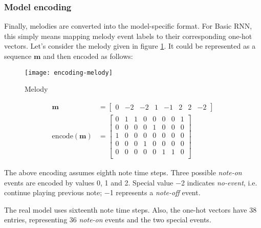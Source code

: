 \documentclass[../../report.tex]{subfiles}
\begin{document}
\subsubsection{Model encoding}

Finally, melodies are converted into the model-specific format. For Basic RNN,
this simply means mapping melody event labels to their corresponding one-hot
vectors. Let's consider the melody given in figure \ref{fig:encoding-melody}. It
could be represented as a sequence \(\bm{m}\) and then encoded as follows:

\begin{figure}[h]
  \centering
  \texttt{[image: encoding-melody]}
  \caption{Melody}
  \label{fig:encoding-melody}
\end{figure}

\begin{align*}
  \bm{m} &=
  \begin{bmatrix}
    0 & -2 & -2 & 1 & -1 & 2 & 2 & -2
  \end{bmatrix}
  \\
  \mathrm{encode}(\bm{m}) &=
  \begin{bmatrix}
    0 & 1 & 1 & 0 & 0 & 0 & 0 & 1 \\
    0 & 0 & 0 & 0 & 1 & 0 & 0 & 0 \\
    1 & 0 & 0 & 0 & 0 & 0 & 0 & 0 \\
    0 & 0 & 0 & 1 & 0 & 0 & 0 & 0 \\
    0 & 0 & 0 & 0 & 0 & 1 & 1 & 0 \\
  \end{bmatrix}
\end{align*}

The above encoding assumes eighth note time steps. Three possible \emph{note-on}
events are encoded by values 0, 1 and 2. Special value \num{-2} indicates
\emph{no-event}, i.e. continue playing previous note; \num{-1} represents a
\emph{note-off} event.

The real model uses sixteenth note time steps. Also, the one-hot vectors have 38
entries, representing 36 \emph{note-on} events and the two special events.
\end{document}
